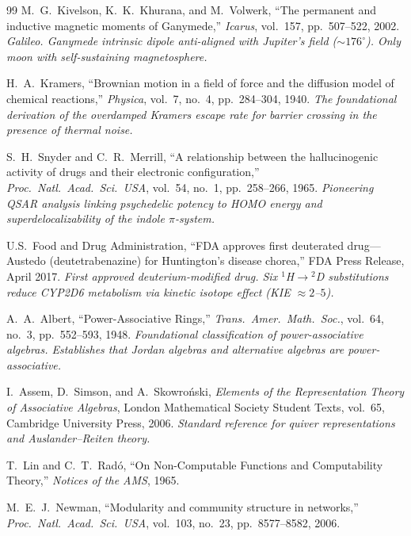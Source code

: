 \begin{thebibliography}{99}
M.~G.~Kivelson, K.~K.~Khurana, and M.~Volwerk,
``The permanent and inductive magnetic moments of Ganymede,''
\emph{Icarus}, vol.~157, pp.~507--522, 2002.
\textit{Galileo. Ganymede intrinsic dipole anti-aligned with Jupiter's field
($\sim 176^\circ$). Only moon with self-sustaining magnetosphere.}

H.~A.~Kramers,
``Brownian motion in a field of force and the diffusion model of chemical reactions,''
\emph{Physica}, vol.~7, no.~4, pp.~284--304, 1940.
\textit{The foundational derivation of the overdamped Kramers escape rate for barrier crossing in the presence of thermal noise.}

S.~H.~Snyder and C.~R.~Merrill,
``A relationship between the hallucinogenic activity of drugs and their electronic configuration,''
\emph{Proc.\ Natl.\ Acad.\ Sci.\ USA}, vol.~54, no.~1, pp.~258--266, 1965.
\textit{Pioneering QSAR analysis linking psychedelic potency to HOMO energy and superdelocalizability of the indole $\pi$-system.}

U.S.~Food and Drug Administration,
``FDA approves first deuterated drug---Austedo (deutetrabenazine) for Huntington's disease chorea,''
FDA Press Release, April 2017.
\textit{First approved deuterium-modified drug. Six ${}^1$H$\to$${}^2$D substitutions reduce CYP2D6 metabolism via kinetic isotope effect (KIE $\approx 2$--$5$).}


A.~A.~Albert,
``Power-Associative Rings,''
\emph{Trans.\ Amer.\ Math.\ Soc.}, vol.~64, no.~3, pp.~552--593, 1948.
\textit{Foundational classification of power-associative algebras. Establishes that Jordan algebras and alternative algebras are power-associative.}

I.~Assem, D.~Simson, and A.~Skowro\'nski,
\emph{Elements of the Representation Theory of Associative Algebras},
London Mathematical Society Student Texts, vol.~65, Cambridge University Press, 2006.
\textit{Standard reference for quiver representations and Auslander--Reiten theory.}

T.~Lin and C.~T.~Rad\'o,
``On Non-Computable Functions and Computability Theory,''
\emph{Notices of the AMS}, 1965.

M.~E.~J.~Newman,
``Modularity and community structure in networks,''
\emph{Proc.\ Natl.\ Acad.\ Sci.\ USA}, vol.~103, no.~23, pp.~8577--8582, 2006.


\end{thebibliography}
